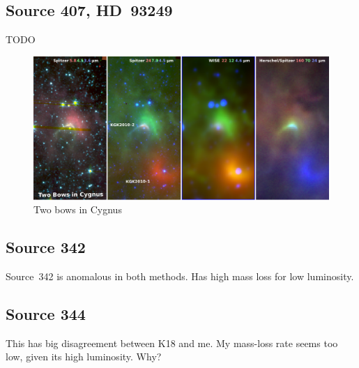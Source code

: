\documentclass[useAMS, usenatbib, a4paper]{mnras}
\begin{document}
\subsection{Source 407, HD~93249}
\label{sec:source-407}

TODO

\begin{figure}
  \centering
  \includegraphics[width=\linewidth]{figs/cygnus-bows-midir-combo}
  \caption{Two bows in Cygnus}
  \label{fig:cygnus-bows}
\end{figure}

\subsection{Source 342}
\label{sec:source-342}

Source~342 is anomalous in both methods. Has high mass loss for low luminosity.


\subsection{Source 344}
\label{sec:source-344}

This has big disagreement between K18 and me.  My mass-loss rate seems too low, given its high luminosity. Why?



\bsp	%
\label{lastpage}
\end{document}
